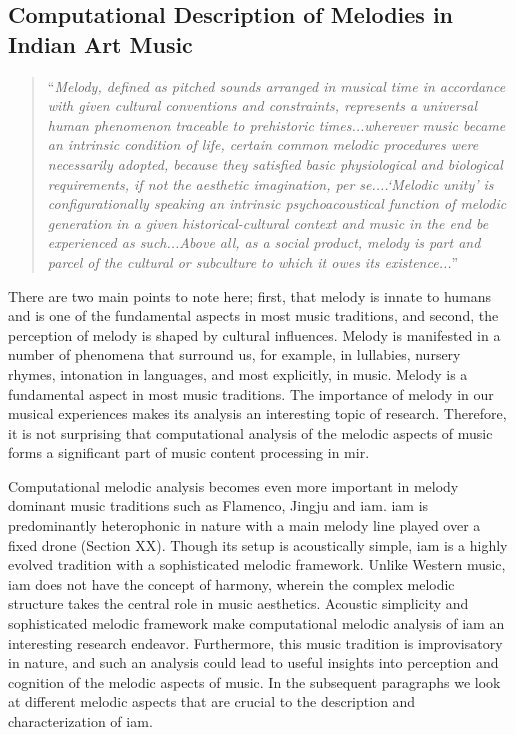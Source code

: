 \subsection{Computational Description of Melodies in Indian Art Music}
\label{sec:intro_melodic_analysis_IAM}


\blockcquote{ringer2001melody}{``\textit{Melody, defined as pitched sounds arranged in musical time in accordance with given cultural conventions and constraints, represents a universal human phenomenon traceable to prehistoric times...wherever music became an intrinsic condition of life, certain common melodic procedures were necessarily adopted, because they satisfied basic physiological and biological requirements, if not the aesthetic imagination, per se....`Melodic unity' is configurationally speaking an intrinsic psychoacoustical function of melodic generation in a given historical-cultural context and music in the end be experienced as such...Above all, as a social product, melody is part and parcel of the cultural or subculture to which it owes its existence...}''}

There are two main points to note here; first, that melody is innate to humans and is one of the fundamental aspects in most music traditions, and second, the perception of melody is shaped by cultural influences. Melody is manifested in a number of phenomena that surround us, for example, in lullabies, nursery rhymes, intonation in languages, and most explicitly, in music. Melody is a fundamental aspect in most music traditions. The importance of melody in our musical experiences makes its analysis an interesting topic of research. Therefore, it is not surprising that computational analysis of the melodic aspects of music forms a significant part of music content processing in \gls{mir}. 

Computational melodic analysis becomes even more important in melody dominant music traditions such as Flamenco, Jingju and \gls{iam}. \gls{iam} is predominantly heterophonic in nature with a main melody line played over a fixed drone (Section XX). Though its setup is acoustically simple, \gls{iam} is a highly evolved tradition with a sophisticated melodic framework. Unlike Western music, \gls{iam} does not have the concept of harmony,  wherein the complex melodic structure takes the central role in music aesthetics. Acoustic simplicity and sophisticated melodic framework make computational melodic analysis of \gls{iam} an interesting research endeavor. Furthermore, this music tradition is improvisatory in nature, and such an analysis could lead to useful insights into perception and cognition of the melodic aspects of music. In the subsequent paragraphs we look at different melodic aspects that are crucial to the description and characterization of \gls{iam}.


